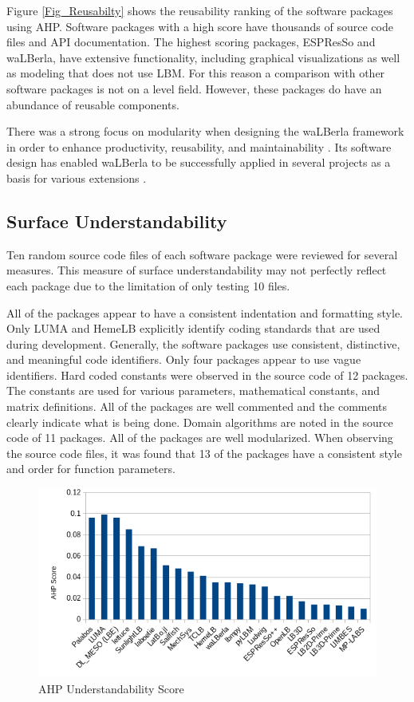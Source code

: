 \documentclass[12pt, notitlepage]{article}
\begin{document}
Figure \ref{Fig_Reusabilty} shows the reusability ranking of the software packages using AHP. Software packages with a high score have thousands of source code files and API documentation. The highest scoring packages, ESPResSo and waLBerla, have extensive functionality, including graphical visualizations as well as modeling that does not use LBM. For this reason a comparison with other software packages is not on a level field. However, these packages do have an abundance of reusable components. 

There was a strong focus on modularity when designing the waLBerla framework in order to enhance productivity, reusability, and maintainability \citep{bauer2021walberla}. Its software design has enabled waLBerla to be successfully applied in several projects as a basis for various extensions \citep{bauer2021walberla}.

\subsection{Surface Understandability}

Ten random source code files of each software package were reviewed for several measures. This measure of surface understandability may not perfectly reflect each package due to the limitation of only testing 10 files. 

All of the packages appear to have a consistent indentation and formatting style. Only LUMA and HemeLB explicitly identify coding standards that are used during development. Generally, the software packages use consistent, distinctive, and meaningful code identifiers. Only four packages appear to use vague identifiers. Hard coded constants were observed in the source code of 12 packages. The constants are used for various parameters, mathematical constants, and matrix definitions. All of the packages are well commented and the comments clearly indicate what is being done. Domain algorithms are noted in the source code of 11 packages. All of the packages are well modularized. When observing the source code files, it was found that 13 of the packages have a consistent style and order for function parameters.

\begin{figure}[h!]
	\begin{center}
		\includegraphics[width=1.0\textwidth]{understandability_chart}
		\caption{AHP Understandability Score}
		\label{Fig_Understandability}
	\end{center}
\end{figure}
\end{document}
